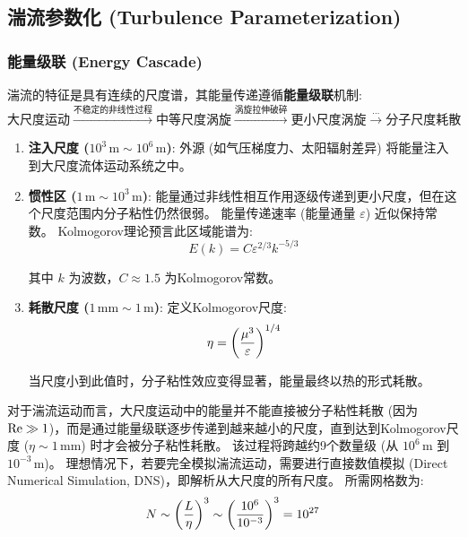 \subsection{湍流参数化 (Turbulence Parameterization)}

\subsubsection{能量级联 (Energy Cascade)}

湍流的特征是具有连续的尺度谱，其能量传递遵循\textbf{能量级联}机制:
\begin{equation*}
    \boxed{\text{大尺度运动} \xrightarrow{\text{不稳定的非线性过程}} \text{中等尺度涡旋} \xrightarrow{\text{涡旋拉伸破碎}} \text{更小尺度涡旋} \xrightarrow{\cdots} \text{分子尺度耗散}}
\end{equation*}

\begin{enumerate}
    \item \textbf{注入尺度 ($10^3\,\mathrm{m} \sim 10^6\,\mathrm{m}$)}:
    外源 (如气压梯度力、太阳辐射差异) 将能量注入到大尺度流体运动系统之中。

    \item \textbf{惯性区 ($1\,\mathrm{m} \sim 10^3\,\mathrm{m}$)}:
    能量通过非线性相互作用逐级传递到更小尺度，但在这个尺度范围内分子粘性仍然很弱。
    能量传递速率 (能量通量 $\varepsilon$) 近似保持常数。
    Kolmogorov理论预言此区域能谱为:
    \begin{equation*}
        E(k) = C \varepsilon^{2/3} k^{-5/3}
    \end{equation*}

    其中 $k$ 为波数，$C \approx 1.5$ 为Kolmogorov常数。

    \item \textbf{耗散尺度 ($1\,\mathrm{mm} \sim 1\,\mathrm{m}$)}:
    定义Kolmogorov尺度:
    \begin{equation}
        \eta = \left(\frac{\mu^3}{\varepsilon}\right)^{1/4}
        \label{eq:kolmogorov_scale}
    \end{equation}

    当尺度小到此值时，分子粘性效应变得显著，能量最终以热的形式耗散。
\end{enumerate}

对于湍流运动而言，大尺度运动中的能量并不能直接被分子粘性耗散 (因为 $\text{Re} \gg 1$)，而是通过能量级联逐步传递到越来越小的尺度，直到达到Kolmogorov尺度 ($\eta \sim 1\,\mathrm{mm}$) 时才会被分子粘性耗散。
该过程将跨越约9个数量级 (从 $10^6\,\mathrm{m}$ 到 $10^{-3}\,\mathrm{m}$)。
理想情况下，若要完全模拟湍流运动，需要进行直接数值模拟 (Direct Numerical Simulation, DNS)，即解析从大尺度的所有尺度。
所需网格数为:
\begin{equation*}
    N \sim \left(\frac{L}{\eta}\right)^3 \sim \left(\frac{10^6}{10^{-3}}\right)^3 = 10^{27}
\end{equation*}

